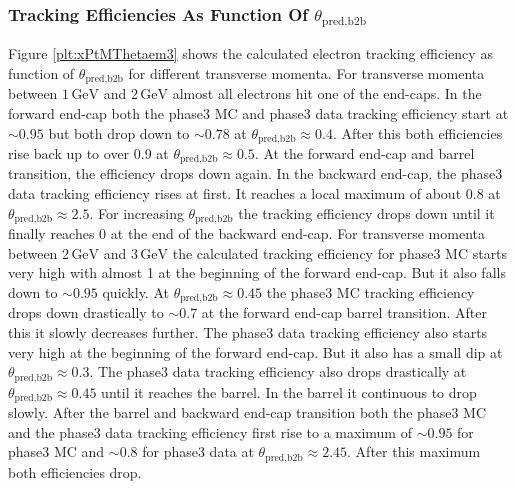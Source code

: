 \documentclass[a4paper,11pt,twosided,final,german,openbib,pdftex,listof=totoc,bibliography=totoc]{scrbook}
\begin{document}
\newpage

\subsubsection{Tracking Efficiencies As Function Of $\theta_{\textrm{pred,b2b}}$}

Figure \ref{plt:xPtMThetaem3} shows the calculated electron tracking efficiency as function of $\theta_{\textrm{pred,b2b}}$ for different transverse momenta.
For transverse momenta between $1\,\textrm{GeV}$ and $2\,\textrm{GeV}$ almost all electrons hit one of the end-caps. In the forward end-cap both the phase3 MC and phase3 data tracking efficiency start at $\sim 0.95$ but both drop down to $\sim 0.78$ at $\theta_{\textrm{pred,b2b}} \approx 0.4$. After this both efficiencies rise back up to over 0.9 at $\theta_{\textrm{pred,b2b}} \approx 0.5$. At the forward end-cap and barrel transition, the efficiency drops down again. In the backward end-cap, the phase3 data tracking efficiency rises at first. It reaches a local maximum of about 0.8 at $\theta_{\textrm{pred,b2b}} \approx 2.5$. For increasing $\theta_{\textrm{pred,b2b}}$ the tracking efficiency drops down until it finally reaches 0 at the end of the backward end-cap.
For transverse momenta between $2\,\textrm{GeV}$ and $3\,\textrm{GeV}$ the calculated tracking efficiency for phase3 MC starts very high with almost 1 at the beginning of the forward end-cap. But it also falls down to $\sim 0.95$ quickly. At $\theta_{\textrm{pred,b2b}} \approx 0.45$ the phase3 MC tracking efficiency drops down drastically to $\sim 0.7$ at the forward end-cap barrel transition. After this it slowly decreases further. The phase3 data tracking efficiency also starts very high at the beginning of the forward end-cap. But it also has a small dip at $\theta_{\textrm{pred,b2b}} \approx 0.3$. The phase3 data tracking efficiency also drops drastically at $\theta_{\textrm{pred,b2b}} \approx 0.45$ until it reaches the barrel. In the barrel it continuous to drop slowly. After the barrel and backward end-cap transition both the phase3 MC and the phase3 data tracking efficiency first rise to a maximum of $\sim 0.95$ for phase3 MC and $\sim 0.8$ for phase3 data at $\theta_{\textrm{pred,b2b}} \approx 2.45$. After this maximum both efficiencies drop.
\end{document}
